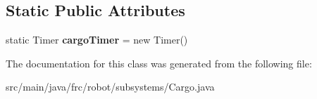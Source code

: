 \subsection*{Static Public Attributes}
\begin{DoxyCompactItemize}
\item 
\mbox{\label{classfrc_1_1robot_1_1subsystems_1_1_cargo_a50722902fa0c3ad0db5f592ad51b94f6}} 
static Timer {\bfseries cargo\+Timer} = new Timer()
\end{DoxyCompactItemize}


The documentation for this class was generated from the following file\+:\begin{DoxyCompactItemize}
\item 
src/main/java/frc/robot/subsystems/Cargo.\+java\end{DoxyCompactItemize}
